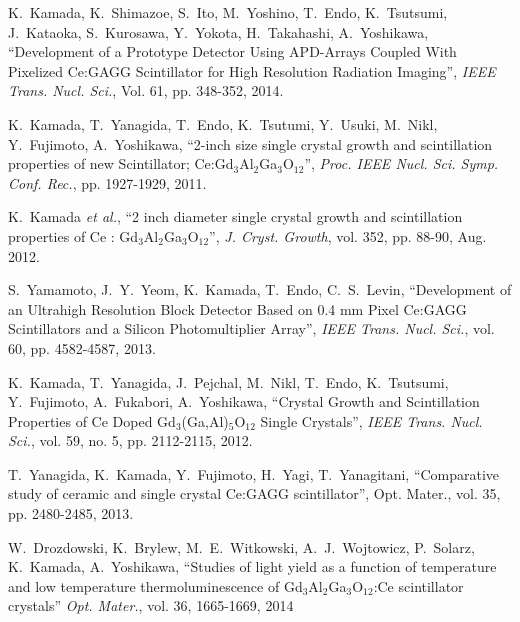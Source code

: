 \documentclass[journal]{IEEEtran}
\begin{document}
\begin{thebibliography}{1}
K.~Kamada, K.~Shimazoe, S.~Ito, M.~Yoshino, T.~Endo, K.~Tsutsumi, J.~Kataoka, S.~Kurosawa, Y.~Yokota, H.~Takahashi, A.~Yoshikawa, ``Development of a Prototype Detector Using APD-Arrays Coupled With Pixelized Ce:GAGG Scintillator for High Resolution Radiation Imaging'', \emph{IEEE Trans. Nucl. Sci.}, Vol. 61, pp. 348-352, 2014. 

K.~Kamada, T.~Yanagida, T.~Endo, K.~Tsutumi, Y.~Usuki, M.~Nikl, Y.~Fujimoto, A.~Yoshikawa, ``2-inch size single crystal growth and scintillation properties of new Scintillator; Ce:Gd$_{3}$Al$_{2}$Ga$_{3}$O$_{12}$'', \emph{Proc. IEEE Nucl. Sci. Symp. Conf. Rec.}, pp. 1927-1929, 2011.

K.~Kamada \emph{et al.}, ``2 inch diameter single crystal growth and scintillation properties of Ce : Gd$_{3}$Al$_{2}$Ga$_{3}$O$_{12}$'', \emph{J. Cryst. Growth}, vol. 352, pp. 88-90, Aug. 2012.


S.~Yamamoto, J.~Y.~Yeom, K.~Kamada, T.~Endo, C.~S.~Levin, ``Development of an Ultrahigh Resolution Block Detector Based on 0.4 mm Pixel Ce:GAGG Scintillators and a Silicon Photomultiplier Array'', \emph{IEEE Trans. Nucl. Sci.}, vol. 60, pp. 4582-4587, 2013. 

K.~Kamada, T.~Yanagida, J.~Pejchal, M.~Nikl, T.~Endo, K.~Tsutsumi, Y.~Fujimoto, A.~Fukabori, A.~Yoshikawa, ``Crystal Growth and Scintillation Properties of Ce Doped Gd$_{3}$(Ga,Al)$_{5}$O$_{12}$ Single Crystals'', \emph{IEEE Trans. Nucl. Sci.}, vol. 59, no. 5, pp. 2112-2115, 2012.

T.~Yanagida, K.~Kamada, Y.~Fujimoto, H.~Yagi, T.~Yanagitani, ``Comparative study of ceramic and single crystal Ce:GAGG scintillator'', Opt. Mater., vol. 35, pp. 2480-2485, 2013.

W.~Drozdowski, K.~Brylew, M.~E.~Witkowski, A.~J.~Wojtowicz, P.~Solarz, K.~Kamada, A.~Yoshikawa, ``Studies of light yield as a function of temperature and low temperature thermoluminescence of Gd$_{3}$Al$_{2}$Ga$_{3}$O$_{12}$:Ce scintillator crystals'' \emph{Opt. Mater.}, vol. 36, 1665-1669, 2014


\end{thebibliography}
\end{document}

